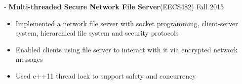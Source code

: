 \documentclass[11pt]{res}
\begin{document}
\begin{resume}
 -\sectionwidth \resumewidth
 \textbf{Multi-threaded Secure Network File Server}{(EECS482)}   \hfill{Fall 2015} \hspace{-0.58in}\vspace{-0mm}\\
  \vspace{-14pt}
 \begin{itemize}[leftmargin=-0.1in]
  \item Implemented a network file server with socket programming, client-server system, hierarchical file system and security protocols\vspace{-5pt}
  \item Enabled clients using file server to interact with it via encrypted network messages \vspace{-5pt}
  \item Used c++11 thread lock to support safety and concurrency\vspace{-3pt}
  \end{itemize}\vspace{-10pt}
   

%







\end{resume}
\end{document}
